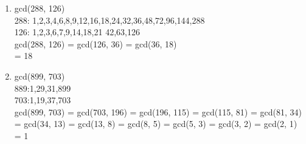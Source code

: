 \documentclass[12pt]{article}
\begin{document}
\begin{enumerate}
\item  gcd(288, 126)\\
288: 1,2,3,4,6,8,9,12,16,18,24,32,36,48,72,96,144,288\\
126: 1,2,3,6,7,9,14,18,21 42,63,126\\
gcd(288, 126) = gcd(126, 36) = gcd(36, 18)\\
= 18
\item  gcd(899, 703)\\
889:1,29,31,899\\
703:1,19,37,703\\
gcd(899, 703) = gcd(703, 196) = gcd(196, 115) = gcd(115, 81) = gcd(81, 34) = gcd(34, 13) = gcd(13, 8) = gcd(8, 5) = gcd(5, 3) = gcd(3, 2) = gcd(2, 1)\\
= 1
\end{enumerate}
\end{document}
